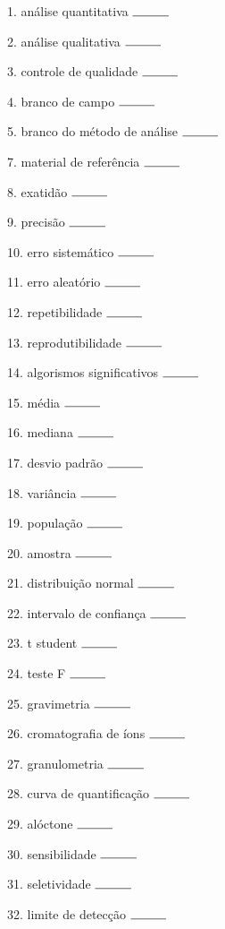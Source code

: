 \documentclass[a4paper,10pt]{article}
\begin{document}
\begin{multicols}{2}

1. análise quantitativa $\rule{1cm}{0.15mm}$

2. análise qualitativa $\rule{1cm}{0.15mm}$

3. controle de qualidade $\rule{1cm}{0.15mm}$

4. branco de campo $\rule{1cm}{0.15mm}$

5. branco do método de análise $\rule{1cm}{0.15mm}$

7. material de referência $\rule{1cm}{0.15mm}$

8. exatidão $\rule{1cm}{0.15mm}$

9. precisão $\rule{1cm}{0.15mm}$

10. erro sistemático $\rule{1cm}{0.15mm}$

11. erro aleatório $\rule{1cm}{0.15mm}$

12. repetibilidade $\rule{1cm}{0.15mm}$

13. reprodutibilidade $\rule{1cm}{0.15mm}$

14. algorismos significativos $\rule{1cm}{0.15mm}$

15. média $\rule{1cm}{0.15mm}$

16. mediana $\rule{1cm}{0.15mm}$

17. desvio padrão $\rule{1cm}{0.15mm}$

18. variância $\rule{1cm}{0.15mm}$

19. população $\rule{1cm}{0.15mm}$

20. amostra $\rule{1cm}{0.15mm}$

21. distribuição normal $\rule{1cm}{0.15mm}$

22. intervalo de confiança $\rule{1cm}{0.15mm}$

23. t student $\rule{1cm}{0.15mm}$

24. teste F $\rule{1cm}{0.15mm}$

25. gravimetria $\rule{1cm}{0.15mm}$

26. cromatografia de íons $\rule{1cm}{0.15mm}$

27. granulometria $\rule{1cm}{0.15mm}$

28. curva de quantificação $\rule{1cm}{0.15mm}$

29. alóctone $\rule{1cm}{0.15mm}$

30. sensibilidade $\rule{1cm}{0.15mm}$

31. seletividade $\rule{1cm}{0.15mm}$

32. limite de detecção $\rule{1cm}{0.15mm}$


\end{multicols}
\end{document}
